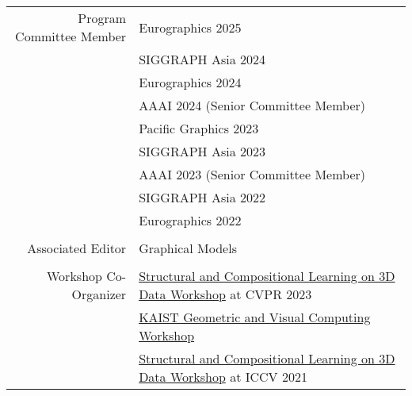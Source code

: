 \documentclass[letterpaper,10pt]{article} %
\newcommand{\blankline}{\quad\pagebreak[2]}
\begin{document}
{\begin{tabular}{r|p{11cm}}
Program Committee Member
    & Eurographics 2025\\
    & SIGGRAPH Asia 2024\\
    & Eurographics 2024\\
    & AAAI 2024 (Senior Committee Member)\\
    & Pacific Graphics 2023\\
    & SIGGRAPH Asia 2023\\
    & AAAI 2023 (Senior Committee Member)\\
    & SIGGRAPH Asia 2022\\
    & Eurographics 2022\\
    &\\
Associated Editor
    & Graphical Models \\
    &\\
Workshop Co-Organizer
    & \href{https://struco3d.github.io/cvpr2023/}{Structural and Compositional Learning on 3D Data Workshop} at CVPR 2023\\
    & \href{https://mhsung.github.io/gvc-workshop-2022/}{KAIST Geometric and Visual Computing Workshop}\\
    & \href{https://struco3d.github.io/iccv2021/}{Structural and Compositional Learning on 3D Data Workshop} at ICCV 2021\\
\end{tabular}\\

\blankline



}
\end{document}
